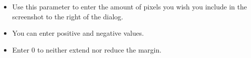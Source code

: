 
\begin{itemize}
\item Use this parameter to enter the amount of pixels you wish you include in the screenshot to the right of the dialog. 
\item You can enter positive and negative values. 
\item Enter 0 to neither extend nor reduce the margin. 
\end{itemize}
